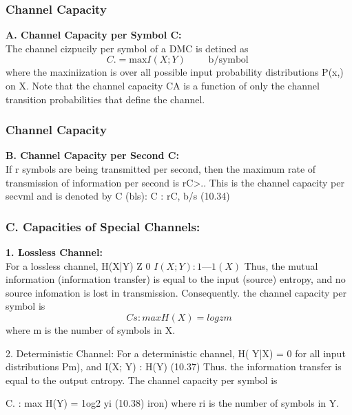 \documentclass[a4]{beamer}
\begin{document}


\begin{frame}
\frametitle{Channel Capacity}

\textbf{A. Channel Capacity per Symbol C:}\\
The channel cizpucily per symbol of a DMC is detined as
\[ 
C. = \mbox{max}I(X; Y) \qquad \mbox{ b/symbol }
\]
where the maxiniization is over all possible input probability distributions {P(x,)} on X. Note that the
channel capacity CA is a function of only the channel transition probabilities that define the channel.
\end{frame}

\begin{frame}
\frametitle{Channel Capacity}
\textbf{B. Channel Capacity per Second C:}\\
If r symbols are being transmitted per second, then the maximum rate of transmission of
information per second is rC>.. This is the channel capacity per secvml and is denoted by C (bls):
C : rC, b/s (10.34)
\end{frame}
\begin{frame}
\frametitle{C. Capacities of Special Channels:}
\textbf{ 1. Lossless Channel:}\\
For a lossless channel, H(X|Y) Z 0 %
$I(X; Y):1—1(X) $
Thus, the mutual information (information transfer) is equal to the input (source) entropy, and no
source infomation is lost in transmission. Consequently. the channel capacity per symbol is
\[
Cs : max H(X) = logzm %
\]
where m is the number of symbols in X.
\end{frame}

\begin{frame}
2. Deterministic Channel:
For a deterministic channel, H( Y|X) = 0 for all input distributions Pm), and
I(X; Y) : H(Y) (10.37)
Thus. the information transfer is equal to the output cntropy. The channel capacity per symbol is

C. : max H(Y) = 1og2 yi (10.38)
iron)
where ri is the number of symbols in Y.
\end{frame}
\end{document}

